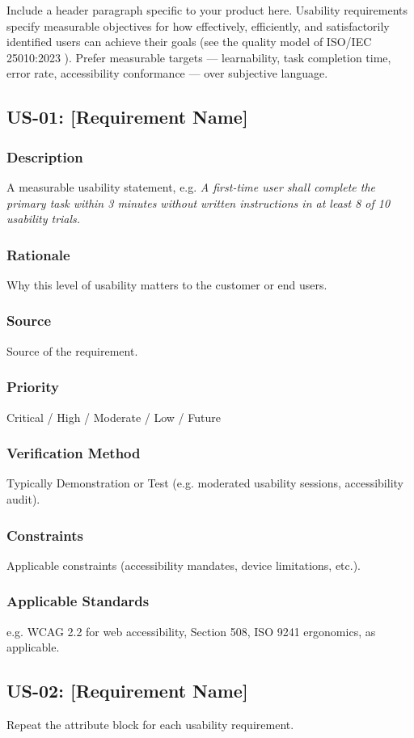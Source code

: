 Include a header paragraph specific to your product here. Usability requirements specify measurable objectives for how effectively, efficiently, and satisfactorily identified users can achieve their goals (see the quality model of ISO/IEC 25010:2023 \cite{ISO25010}). Prefer measurable targets --- learnability, task completion time, error rate, accessibility conformance --- over subjective language.

\subsection{US-01: [Requirement Name]}
\subsubsection{Description}
A measurable usability statement, e.g. \textit{A first-time user shall complete the primary task within 3 minutes without written instructions in at least 8 of 10 usability trials.}
\subsubsection{Rationale}
Why this level of usability matters to the customer or end users.
\subsubsection{Source}
Source of the requirement.
\subsubsection{Priority}
Critical / High / Moderate / Low / Future
\subsubsection{Verification Method}
Typically Demonstration or Test (e.g. moderated usability sessions, accessibility audit).
\subsubsection{Constraints}
Applicable constraints (accessibility mandates, device limitations, etc.).
\subsubsection{Applicable Standards}
e.g. WCAG 2.2 for web accessibility, Section 508, ISO 9241 ergonomics, as applicable.

\subsection{US-02: [Requirement Name]}
Repeat the attribute block for each usability requirement.
